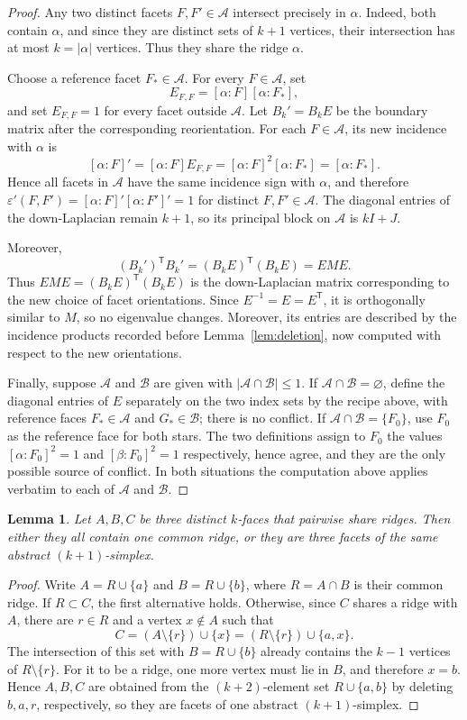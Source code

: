 \documentclass[11pt,reqno]{amsart}
\numberwithin{equation}{section}
\theoremstyle{plain}
\newtheorem{lemma}[theorem]{Lemma}
\theoremstyle{definition}
\newcommand{\eps}{\varepsilon}
\newcommand{\T}{\mathsf{T}}
\newcommand{\Aset}{\mathcal A}
\newcommand{\Bset}{\mathcal B}
\begin{document}
\begin{proof}
Any two distinct facets $F,F'\in\Aset$ intersect precisely in $\alpha$. Indeed, both contain
$\alpha$, and since they are distinct sets of $k+1$ vertices, their intersection has at most
$k=|\alpha|$ vertices. Thus they share the ridge $\alpha$.

Choose a reference facet $F_*\in\Aset$. For every $F\in\Aset$, set
\[
  E_{F,F}=[\alpha:F][\alpha:F_*] ,
\]
and set $E_{F,F}=1$ for every facet outside $\Aset$. Let $B_k'=B_k E$ be the boundary matrix
after the corresponding reorientation. For each $F\in\Aset$, its new incidence with $\alpha$
is
\[
  [\alpha:F]'=[\alpha:F]E_{F,F}
  ={[\alpha:F]}^{2}[\alpha:F_*]=[\alpha:F_*].
\]
Hence all facets in $\Aset$ have the same incidence sign with $\alpha$, and therefore
$\eps'(F,F')=[\alpha:F]'[\alpha:F']'=1$ for distinct $F,F'\in\Aset$. The diagonal entries of
the down-Laplacian remain $k+1$, so its principal block on $\Aset$ is $kI+J$.

Moreover,
\[
  {(B_k')}^{\T}B_k'={(B_k E)}^{\T}(B_k E)=EME .
\]
Thus $EME={(B_k E)}^{\T}(B_k E)$ is the down-Laplacian matrix corresponding to the new choice of
facet orientations. Since $E^{-1}=E=E^{\T}$, it is orthogonally similar to $M$, so no
eigenvalue changes. Moreover, its entries are described by the incidence products recorded
before Lemma~\ref{lem:deletion}, now computed with respect to the new orientations.

Finally, suppose $\Aset$ and $\Bset$ are given with $|\Aset\cap\Bset|\le1$. If
$\Aset\cap\Bset=\varnothing$, define the diagonal entries of $E$ separately on the two index
sets by the recipe above, with reference faces $F_*\in\Aset$ and $G_*\in\Bset$; there is no
conflict. If $\Aset\cap\Bset=\{F_0\}$, use $F_0$ as the reference face for both stars. The two
definitions assign to $F_0$ the values ${[\alpha:F_0]}^{2}=1$ and ${[\beta:F_0]}^{2}=1$ respectively,
hence agree, and they are the only possible source of conflict. In both situations the
computation above applies verbatim to each of $\Aset$ and $\Bset$.
\end{proof}

\begin{lemma}\label{lem:triangle}
Let $A,B,C$ be three distinct $k$-faces that pairwise share ridges. Then either they all contain
one common ridge, or they are three facets of the same abstract $(k+1)$-simplex.
\end{lemma}

\begin{proof}
Write $A=R\cup\{a\}$ and $B=R\cup\{b\}$, where $R=A\cap B$ is their common ridge. If
$R\subset C$, the first alternative holds. Otherwise, since $C$ shares a ridge with $A$, there
are $r\in R$ and a vertex $x\notin A$ such that
\[
  C=(A\setminus\{r\})\cup\{x\}=(R\setminus\{r\})\cup\{a,x\}.
\]
The intersection of this set with $B=R\cup\{b\}$ already contains the $k-1$ vertices of
$R\setminus\{r\}$. For it to be a ridge, one more vertex must lie in $B$, and therefore
$x=b$. Hence $A,B,C$ are obtained from the $(k+2)$-element set $R\cup\{a,b\}$ by deleting
$b,a,r$, respectively, so they are facets of one abstract $(k+1)$-simplex.
\end{proof}
\end{document}

